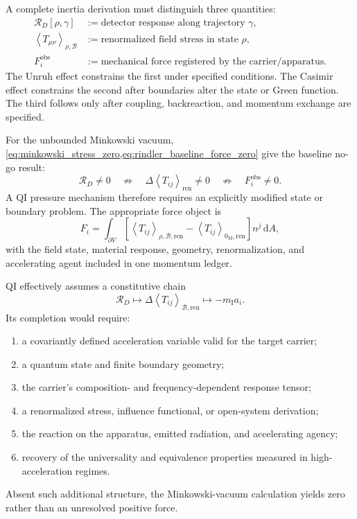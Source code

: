 \documentclass[11pt]{article}
\newcommand{\dd}{\mathrm{d}}
\newcommand{\avg}[1]{\left\langle #1\right\rangle}
\newcommand{\Bdy}{\mathcal{B}}
\begin{document}
A complete inertia derivation must distinguish three quantities:
\begin{align}
    \mathcal R_{D}[\rho,\gamma] &:= \text{detector response along trajectory }\gamma,\\
    \avg{T_{\mu\nu}}_{\rho,\Bdy} &:= \text{renormalized field stress in state }\rho,\\
    F^{\mathrm{obs}}_{i} &:= \text{mechanical force registered by the carrier/apparatus}.
\end{align}
The Unruh effect constrains the first under specified conditions. The Casimir effect constrains the second after boundaries alter the state or Green function. The third follows only after coupling, backreaction, and momentum exchange are specified.

For the unbounded Minkowski vacuum, \cref{eq:minkowski_stress_zero,eq:rindler_baseline_force_zero} give the baseline no-go result:
\begin{equation}
    \mathcal R_D\neq0
    \quad\not\Rightarrow\quad
    \Delta\avg{T_{ij}}_{\mathrm{ren}}\neq0
    \quad\not\Rightarrow\quad
    F_i^{\mathrm{obs}}\neq0.
    \label{eq:unruh_no_force_implication}
\end{equation}
A QI pressure mechanism therefore requires an explicitly modified state or boundary problem. The appropriate force object is
\begin{equation}
    F_i
    =\int_{\partial V}
    \left[
    \avg{T_{ij}}_{\rho,\Bdy,\mathrm{ren}}
    -\avg{T_{ij}}_{0_{\mathrm M},\mathrm{ren}}
    \right]n^{j}\,\dd A,
    \label{eq:boundary_modified_force}
\end{equation}
with the field state, material response, geometry, renormalization, and accelerating agent included in one momentum ledger.

QI effectively assumes a constitutive chain
\begin{equation}
    \mathcal R_{D}
    \longmapsto
    \Delta\avg{T_{ij}}_{\Bdy,\mathrm{ren}}
    \longmapsto
    -m_{\mathrm I}a_{i}.
    \label{eq:unruh_to_force}
\end{equation}
Its completion would require:
\begin{enumerate}[leftmargin=1.55em]
    \item a covariantly defined acceleration variable valid for the target carrier;
    \item a quantum state and finite boundary geometry;
    \item the carrier's composition- and frequency-dependent response tensor;
    \item a renormalized stress, influence functional, or open-system derivation;
    \item the reaction on the apparatus, emitted radiation, and accelerating agency;
    \item recovery of the universality and equivalence properties measured in high-acceleration regimes.
\end{enumerate}
Absent such additional structure, the Minkowski-vacuum calculation yields zero rather than an unresolved positive force.
\end{document}
